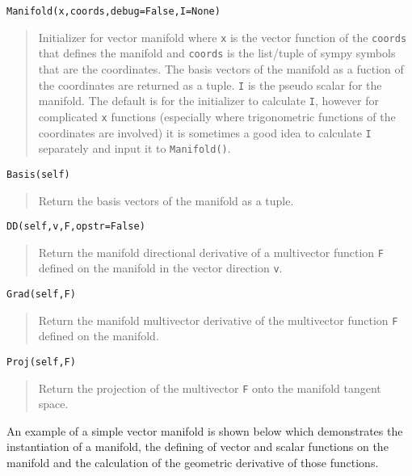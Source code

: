 \documentclass[10pt]{article}
\newcommand{\T}[1]{\texttt{#1}}
\begin{document}
\T{Manifold(x,coords,debug=False,I=None)}
\begin{quote}
   Initializer for vector manifold where \T{x} is the vector function of the \T{coords} that defines the manifold and \T{coords} is the list/tuple
   of sympy symbols that are the coordinates.  The basis vectors of the manifold as a fuction of the coordinates are returned as a tuple. \T{I}
   is the pseudo scalar for the manifold.  The default is for the initializer to calculate \T{I}, however for complicated \T{x} functions (especially
   where trigonometric functions of the coordinates are involved) it is sometimes a good idea to calculate \T{I} separately and input it to \T{Manifold()}.
\end{quote}
\T{Basis(self)}
\begin{quote}
   Return the basis vectors of the manifold as a tuple.
\end{quote}
\T{DD(self,v,F,opstr=False)}
\begin{quote}
   Return the manifold directional derivative of a multivector function \T{F} defined on the manifold in the vector direction \T{v}.
\end{quote}
\T{Grad(self,F)}
\begin{quote}
   Return the manifold multivector derivative of the multivector function \T{F} defined on the manifold.
\end{quote}

\T{Proj(self,F)}
\begin{quote}
   Return the projection of the multivector \T{F} onto the manifold tangent space.
\end{quote}

An example of a simple vector manifold is shown below which demonstrates the instantiation of a manifold, the defining
of vector and scalar functions on the manifold and the calculation of the geometric derivative of those functions. \\
\end{document}
